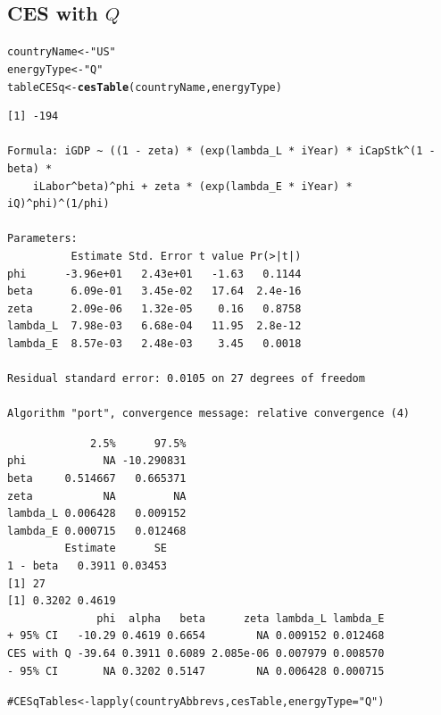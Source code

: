 \documentclass[preprint,authoryear,12pt]{elsarticle}\usepackage{graphicx, color}
\makeatletter
\newcommand{\hlfunctioncall}[1]{\textcolor[rgb]{0.501960784313725,0,0.329411764705882}{\textbf{#1}}}%
\newcommand{\hlstring}[1]{\textcolor[rgb]{0.6,0.6,1}{#1}}%
\newcommand{\hlcomment}[1]{\textcolor[rgb]{0.180392156862745,0.6,0.341176470588235}{#1}}%
\newenvironment{kframe}{%
 \def\at@end@of@kframe{}%
 \ifinner\ifhmode%
  \def\at@end@of@kframe{\end{minipage}}%
  \begin{minipage}{\columnwidth}%
 \fi\fi%
 \def\FrameCommand##1{\hskip\@totalleftmargin \hskip-\fboxsep
 \colorbox{shadecolor}{##1}\hskip-\fboxsep
     \hskip-\linewidth \hskip-\@totalleftmargin \hskip\columnwidth}%
 \MakeFramed {\advance\hsize-\width
   \@totalleftmargin\z@ \linewidth\hsize
   \@setminipage}}%
 {\par\unskip\endMakeFramed%
 \at@end@of@kframe}
\newenvironment{knitrout}{}{} %
\makeatother
\begin{document}
\subsection{CES with $Q$}
\begin{knitrout}
\color{fgcolor}\begin{kframe}
\begin{alltt}
countryName <- \hlstring{"US"}
energyType <- \hlstring{"Q"}
tableCESq <- \hlfunctioncall{cesTable}(countryName, energyType)
\end{alltt}
\begin{verbatim}
[1] -194

Formula: iGDP ~ ((1 - zeta) * (exp(lambda_L * iYear) * iCapStk^(1 - beta) * 
    iLabor^beta)^phi + zeta * (exp(lambda_E * iYear) * iQ)^phi)^(1/phi)

Parameters:
          Estimate Std. Error t value Pr(>|t|)
phi      -3.96e+01   2.43e+01   -1.63   0.1144
beta      6.09e-01   3.45e-02   17.64  2.4e-16
zeta      2.09e-06   1.32e-05    0.16   0.8758
lambda_L  7.98e-03   6.68e-04   11.95  2.8e-12
lambda_E  8.57e-03   2.48e-03    3.45   0.0018

Residual standard error: 0.0105 on 27 degrees of freedom

Algorithm "port", convergence message: relative convergence (4) 
\end{verbatim}


{\ttfamily\noindent\itshape\color{messagecolor}{Waiting for profiling to be done...}}\begin{verbatim}
             2.5%      97.5%
phi            NA -10.290831
beta     0.514667   0.665371
zeta           NA         NA
lambda_L 0.006428   0.009152
lambda_E 0.000715   0.012468
         Estimate      SE
1 - beta   0.3911 0.03453
[1] 27
[1] 0.3202 0.4619
              phi  alpha   beta      zeta lambda_L lambda_E
+ 95% CI   -10.29 0.4619 0.6654        NA 0.009152 0.012468
CES with Q -39.64 0.3911 0.6089 2.085e-06 0.007979 0.008570
- 95% CI       NA 0.3202 0.5147        NA 0.006428 0.000715
\end{verbatim}
\begin{alltt}

\hlcomment{#CESqTables <- lapply(countryAbbrevs, cesTable, energyType="Q")}
\end{alltt}
\end{kframe}
\end{knitrout}
\end{document}
